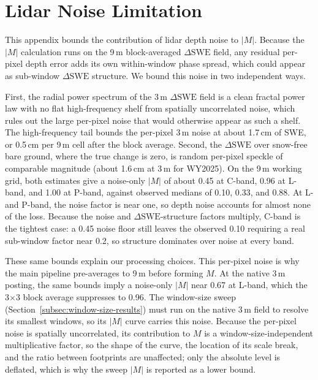 \documentclass[tc, manuscript]{copernicus}
\begin{document}




\appendix
\section{Lidar Noise Limitation}\label{appendix:noise}    %

This appendix bounds the contribution of lidar depth noise to $|M|$. Because the $|M|$ calculation runs on the 9\,\unit{m} block-averaged $\Delta\mathrm{SWE}$ field, any residual per-pixel depth error adds its own within-window phase spread, which could appear as sub-window $\Delta\mathrm{SWE}$ structure. We bound this noise in two independent ways.

First, the radial power spectrum of the 3\,\unit{m} $\Delta\mathrm{SWE}$ field is a clean fractal power law with no flat high-frequency shelf from spatially uncorrelated noise, which rules out the large per-pixel noise that would otherwise appear as such a shelf. The high-frequency tail bounds the per-pixel 3\,\unit{m} noise at about 1.7\,\unit{cm} of SWE, or 0.5\,\unit{cm} per 9\,\unit{m} cell after the block average. Second, the $\Delta\mathrm{SWE}$ over snow-free bare ground, where the true change is zero, is random per-pixel speckle of comparable magnitude (about 1.6\,\unit{cm} at 3\,\unit{m} for WY2025). On the 9\,\unit{m} working grid, both estimates give a noise-only $|M|$ of about 0.45 at C-band, 0.96 at L-band, and 1.00 at P-band, against observed medians of 0.10, 0.33, and 0.88. At L- and P-band, the noise factor is near one, so depth noise accounts for almost none of the loss. Because the noise and $\Delta\mathrm{SWE}$-structure factors multiply, C-band is the tightest case: a 0.45 noise floor still leaves the observed 0.10 requiring a real sub-window factor near 0.2, so structure dominates over noise at every band.

These same bounds explain our processing choices. This per-pixel noise is why the main pipeline pre-averages to 9\,\unit{m} before forming $M$. At the native 3\,\unit{m} posting, the same bounds imply a noise-only $|M|$ near 0.67 at L-band, which the 3$\times$3 block average suppresses to 0.96. The window-size sweep (Section~\ref{subsec:window-size-results}) must run on the native 3\,\unit{m} field to resolve its smallest windows, so its $|M|$ curve carries this noise. Because the per-pixel noise is spatially uncorrelated, its contribution to $M$ is a window-size-independent multiplicative factor, so the shape of the curve, the location of its scale break, and the ratio between footprints are unaffected; only the absolute level is deflated, which is why the sweep $|M|$ is reported as a lower bound.
\end{document}
